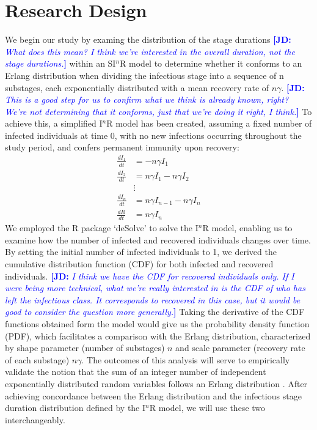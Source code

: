\documentclass[12pt]{article}
\newcommand{\comment}{}
\renewcommand{\comment}{\nocomment}
\renewcommand{\comment}{\showcomment}
\newcommand{\showcomment}[3]{\textcolor{#1}{\textbf{[#2: }\textsl{#3}\textbf{]}}}
\newcommand{\nocomment}[3]{}
\newcommand{\jd}[1]{\comment{blue}{JD}{#1}}
\begin{document}
\section*{Research Design}
We begin our study by examing the distribution of the stage durations
\jd{What does this mean? I think we're interested in the overall duration, not the stage durations.}
within an SI$^n$R model to determine whether it conforms to an Erlang distribution when dividing the infectious stage into a sequence of n substages, each exponentially distributed with a mean recovery rate of $n\gamma$. 
\jd{This is a good step for us to confirm what we think is already known, right? We're not determining that it conforms, just that we're doing it right, I think.}
To achieve this, a simplified I$^n$R model has been created, assuming a fixed number of infected individuals at time 0, with no new infections occurring throughout the study period, and confers permanent immunity upon recovery:
\begin{align*}
    \frac{dI_1}{dt} &= -n \gamma I_1 \\
    \frac{dI_2}{dt} &= n \gamma I_1 - n \gamma I_2 \\
    &\vdots \\
    \frac{dI_n}{dt} &= n \gamma I_{n-1} - n \gamma I_n \\
    \frac{dR}{dt} &= n \gamma I_n 
\end{align*}
We employed the R package ‘deSolve’ to solve the I$^n$R model, enabling us to examine how the number of infected and recovered individuals changes over time. By setting the initial number of infected individuals to 1, we derived the cumulative distribution function (CDF) for both infected and recovered individuals.
\jd{I think we have the CDF for recovered individuals only. If I were being more technical, what we're really interested in is the CDF of who has \emph{left} the infectious class. It corresponds to recovered in this case, but it would be good to consider the question more generally.}
Taking the derivative of the CDF functions obtained form the model would give us the probability density function (PDF), which facilitates a comparison with the Erlang distribution, characterized by shape parameter (number of substages) $n$ and scale parameter (recovery rate of each substage) $n\gamma$. The outcomes of this analysis will serve to empirically validate the notion that the sum of an integer number of independent exponentially distributed random variables follows an Erlang distribution \cite{Tummal2011}. After achieving concordance between the Erlang distribution and the infectious stage duration distribution defined by the I$^n$R model, we will use these two interchangeably.
\end{document}
